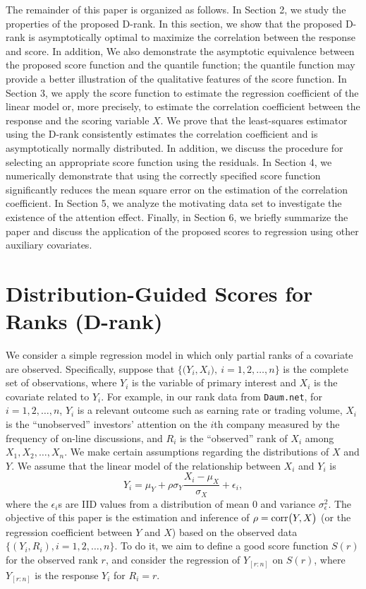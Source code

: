 \documentclass[12pt]{article}
\begin{document}
The remainder of this paper is organized as follows. In Section 2, we study the 
properties of the proposed D-rank. In this section, we show that the proposed D-rank
is asymptotically optimal to maximize the correlation between the response and score. 
In addition, We also demonstrate the 
asymptotic equivalence between the proposed score function and the quantile 
function; the quantile function may provide a better illustration of the 
qualitative features of the score function. In Section 3, we apply 
the score function to estimate the regression coefficient of the linear model or, 
more precisely, to estimate the correlation coefficient between 
the response and the scoring variable $X$.  
We prove that the least-squares estimator using the D-rank 
consistently estimates the correlation coefficient and is asymptotically normally 
distributed. In addition, we discuss the procedure for selecting an appropriate score function using 
the residuals.  
In Section 4, we numerically demonstrate that using the correctly specified score function 
significantly reduces the mean square error on the estimation of the correlation coefficient. 
In Section 5, we analyze the motivating data set to investigate the existence of the attention 
effect. Finally, in Section 6, we briefly summarize the paper and discuss 
the application of the proposed scores to regression using other auxiliary covariates. 


\section{Distribution-Guided Scores for Ranks (D-rank)} 

We consider a simple regression model in which only partial ranks of a covariate are observed. Specifically, suppose that $\big\{ \big( Y_{i}, X_{i} \big), ~i=1,2,\ldots,n \big\}$ is the complete set of observations,
where $Y_{i}$ is the variable of primary interest and $X_{i}$ is the covariate related to $Y_i$. For example,
in our rank data from \texttt{Daum.net}, for $i=1,2,\ldots,n$, $Y_i$
is a relevant outcome such as earning rate or trading volume,
$X_i$ is the ``unobserved'' investors' attention on the $i$th company measured by the frequency of on-line discussions, and $R_i$ is the ``observed'' rank of $X_i$ among $X_1,X_2,\ldots,X_n$.  We 
make certain assumptions regarding the distributions of $X$ and $Y$. 
We assume that the linear model of the relationship between $X_i$ and $Y_i$ is 
\begin{equation}  \label{eqn:lm}
Y_i = \mu_Y + \rho \sigma_Y \frac{X_i - \mu_X}{\sigma_X} + \epsilon_i,
\end{equation}
where the $\epsilon_i$s are IID values from a distribution of mean $0$ and variance $\sigma_{\epsilon}^2$.
The objective of this paper is the estimation and inference of $\rho={\rm corr} \big(Y, X\big)$ (or
the regression coefficient between $Y$ and $X$) based on the observed data $\big\{ (Y_i, R_i), i=1,2,\ldots,n \big\}$. 
To do it, we aim to define a good score function $S(r)$ for the observed rank $r$, and 
consider the regression of $Y_{[r:n]}$ on $S(r)$, where $Y_{[r:n]}$ is the response $Y_i$ for $R_i=r$.  
\end{document}
